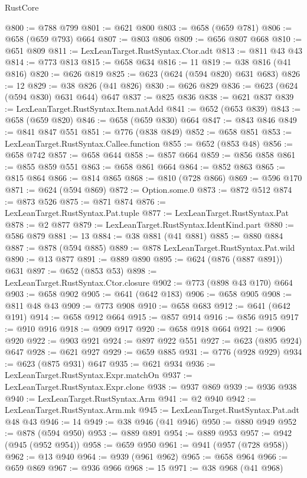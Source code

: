 \begin{lexlean}{RustCore}
\begin{coremodule}
@800 := @788 @799
@801 := @621 @800
@803 := @658 (@659 @781)
@806 := @658 (@659 @793) @664
@807 := @803 @806
@809 := @656 @807 @668
@810 := @651 @809
@811 := LexLeanTarget.RustSyntax.Ctor.adt
@813 := @811 @43 @43
@814 := @773 @813
@815 := @658 @634
@816 := 11
@819 := @38 @816 (@41 @816)
@820 := @626 @819
@825 := @623 (@624 (@594 @820) @631 @683)
@826 := 12
@829 := @38 @826 (@41 @826)
@830 := @626 @829
@836 := @623 (@624 (@594 @830) @631 @644) @647
@837 := @825 @836
@838 := @621 @837
@839 := LexLeanTarget.RustSyntax.Item.natAdd
@841 := @652 (@653 @839)
@843 := @658 (@659 @820)
@846 := @658 (@659 @830) @664
@847 := @843 @846
@849 := @841 @847 @551
@851 := @776 (@838 @849)
@852 := @658 @851
@853 := LexLeanTarget.RustSyntax.Callee.function
@855 := @652 (@853 @48)
@856 := @658 @742
@857 := @658 @644
@858 := @857 @664
@859 := @856 @858
@861 := @855 @859 @551
@863 := @658 @861 @664
@864 := @852 @863
@865 := @815 @864
@866 := @814 @865
@868 := @810 (@728 @866)
@869 := @596 @170
@871 := @624 (@594 @869)
@872 := Option.some.{0}
@873 := @872 @512
@874 := @873 @526
@875 := @871 @874
@876 := LexLeanTarget.RustSyntax.Pat.tuple
@877 := LexLeanTarget.RustSyntax.Pat
@878 := @2 @877
@879 := LexLeanTarget.RustSyntax.IdentKind.part
@880 := @586 @879
@881 := 13
@884 := @38 @881 (@41 @881)
@885 := @880 @884
@887 := @878 (@594 @885)
@889 := @878 LexLeanTarget.RustSyntax.Pat.wild
@890 := @13 @877
@891 := @889 @890
@895 := @624 (@876 (@887 @891)) @631
@897 := @652 (@853 @53)
@898 := LexLeanTarget.RustSyntax.Ctor.closure
@902 := @773 (@898 @43 @170) @664
@903 := @658 @902
@905 := @641 (@642 @183)
@906 := @658 @905
@908 := @811 @48 @43
@909 := @773 @908
@910 := @658 @683
@912 := @641 (@642 @191)
@914 := @658 @912 @664
@915 := @857 @914
@916 := @856 @915
@917 := @910 @916
@918 := @909 @917
@920 := @658 @918 @664
@921 := @906 @920
@922 := @903 @921
@924 := @897 @922 @551
@927 := @623 (@895 @924) @647
@928 := @621 @927
@929 := @659 @885
@931 := @776 (@928 @929)
@934 := @623 (@875 @931) @647
@935 := @621 @934
@936 := LexLeanTarget.RustSyntax.Expr.matchOn
@937 := LexLeanTarget.RustSyntax.Expr.clone
@938 := @937 @869
@939 := @936 @938
@940 := LexLeanTarget.RustSyntax.Arm
@941 := @2 @940
@942 := LexLeanTarget.RustSyntax.Arm.mk
@945 := LexLeanTarget.RustSyntax.Pat.adt @48 @43
@946 := 14
@949 := @38 @946 (@41 @946)
@950 := @880 @949
@952 := @878 (@594 @950)
@953 := @889 @891
@954 := @889 @953
@957 := @942 (@945 (@952 @954))
@958 := @659 @950
@961 := @941 (@957 (@728 @958))
@962 := @13 @940
@964 := @939 (@961 @962)
@965 := @658 @964
@966 := @659 @869
@967 := @936 @966
@968 := 15
@971 := @38 @968 (@41 @968)

\end{coremodule}
\end{lexlean}
